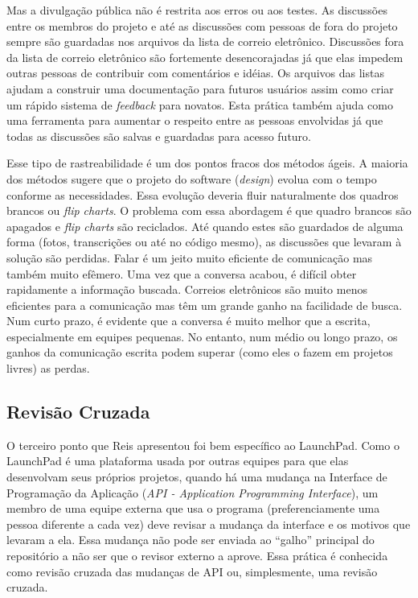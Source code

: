 Mas a divulgação pública não é restrita aos erros ou aos testes. As
discussões entre os membros do projeto e até as discussões com pessoas
de fora do projeto sempre são guardadas nos arquivos da lista de
correio eletrônico. Discussões fora da lista de correio eletrônico são
fortemente desencorajadas já que elas impedem outras pessoas de
contribuir com comentários e idéias. Os arquivos das listas ajudam a
construir uma documentação para futuros usuários assim como criar um
rápido sistema de \emph{feedback} para novatos. Esta prática também
ajuda como uma ferramenta para aumentar o respeito entre as pessoas
envolvidas já que todas as discussões são salvas e guardadas para
acesso futuro.

Esse tipo de rastreabilidade é um dos pontos fracos dos métodos
ágeis. A maioria dos métodos sugere que o projeto do software
(\emph{design}) evolua com o tempo conforme as necessidades. Essa
evolução deveria fluir naturalmente dos quadros brancos ou \emph{flip
  charts}. O problema com essa abordagem é que quadro brancos são
apagados e \emph{flip charts} são reciclados.  Até quando estes são
guardados de alguma forma (fotos, transcrições ou até no código
mesmo), as discussões que levaram à solução são perdidas. Falar é um
jeito muito eficiente de comunicação mas também muito efêmero. Uma vez
que a conversa acabou, é difícil obter rapidamente a informação
buscada. Correios eletrônicos são muito menos eficientes para a
comunicação mas têm um grande ganho na facilidade de busca. Num curto
prazo, é evidente que a conversa é muito melhor que a escrita,
especialmente em equipes pequenas. No entanto, num médio ou longo
prazo, os ganhos da comunicação escrita podem superar (como eles o
fazem em projetos livres) as perdas.

\subsection{Revisão Cruzada}
\label{subsec:crossrev}

O terceiro ponto que Reis apresentou foi bem específico ao
LaunchPad. Como o LaunchPad é uma plataforma usada por outras equipes
para que elas desenvolvam seus próprios projetos, quando há uma
mudança na Interface de Programação da Aplicação (\emph{API -
  Application Programming Interface}), um membro de uma equipe externa
que usa o programa (preferenciamente uma pessoa diferente a cada vez)
deve revisar a mudança da interface e os motivos que levaram a
ela. Essa mudança não pode ser enviada ao ``galho'' principal do
repositório a não ser que o revisor externo a aprove. Essa prática é
conhecida como revisão cruzada das mudanças de API ou, simplesmente,
uma revisão cruzada.

